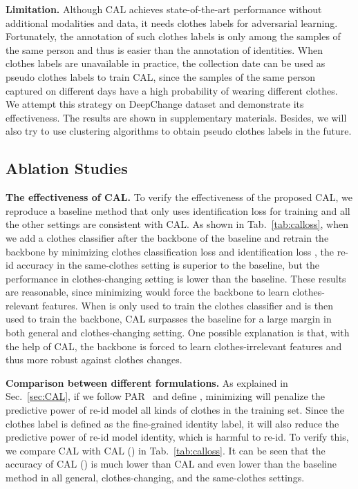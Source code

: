\documentclass[10pt,twocolumn,letterpaper]{article}
\begin{document}
\medskip
\noindent
\textbf{Limitation.}
Although CAL achieves state-of-the-art performance without additional modalities and data, it needs clothes labels for adversarial learning.
Fortunately, the annotation of such clothes labels is only among the samples of the same person and thus is easier than the annotation of identities.
When clothes labels are unavailable in practice, the collection date can be used as pseudo clothes labels to train CAL, since the samples of the same person captured on different days have a high probability of wearing different clothes. We attempt this strategy on DeepChange dataset and demonstrate its effectiveness.
The results are shown in supplementary materials.
Besides, we will also try to use clustering algorithms to obtain pseudo clothes labels in the future.



\subsection{Ablation Studies}
\label{sec:ablationstudy}

\noindent
\textbf{The effectiveness of CAL.}
To verify the effectiveness of the proposed CAL, we reproduce a baseline method that only uses identification loss  for training and all the other settings are consistent with CAL.
As shown in Tab.~\ref{tab:calloss}, when we add a clothes classifier after the backbone of the baseline and retrain the backbone by minimizing clothes classification loss  and identification loss , the re-id accuracy in the same-clothes setting is superior to the baseline, but the performance in clothes-changing setting is lower than the baseline.
These results are reasonable, since minimizing  would force the backbone to learn clothes-relevant features.
When  is only used to train the clothes classifier and  is then used to train the backbone, CAL surpasses the baseline for a large margin in both general and clothes-changing setting.
One possible explanation is that, with the help of CAL, the backbone is forced to learn clothes-irrelevant features and thus more robust against clothes changes.

\medskip
\noindent
\textbf{Comparison between different formulations.}
As explained in Sec.~\ref{sec:CAL}, if we follow PAR~\cite{Wang2019LearningRobust} and define , minimizing  will penalize the predictive power of re-id model \wrt all kinds of clothes in the training set.
Since the clothes label is defined as the fine-grained identity label, it will also reduce the predictive power of re-id model \wrt identity, which is harmful to re-id.
To verify this, we compare CAL with CAL () in Tab.~\ref{tab:calloss}.
It can be seen that the accuracy of CAL () is much lower than CAL and even lower than the baseline method in all general, clothes-changing, and the same-clothes settings.
\end{document}
